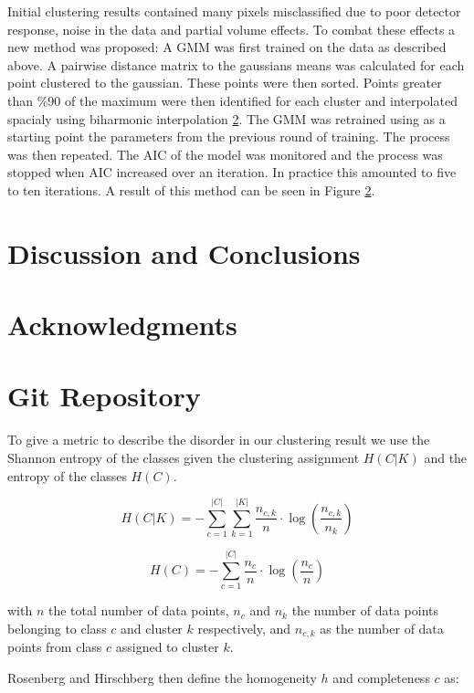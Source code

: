 \documentclass[a4paper,11pt]{article}
\begin{document}
Initial clustering results contained many pixels misclassified due to poor detector response, noise in the data and partial volume effects. To combat these effects a new method was proposed: A GMM was first trained on the data as described above. A pairwise distance matrix to the gaussians means was calculated for each point clustered to the gaussian. These points were then sorted. Points greater than \%90 of the maximum were then identified for each cluster and interpolated spacialy using biharmonic interpolation \ref{}. The GMM was retrained using as a starting point the parameters from the previous round of training. The process was then repeated. The AIC of the model was monitored and the process was stopped when AIC increased over an iteration. In practice this amounted to five to ten iterations. A result of this method can be seen in Figure \ref{}.

\section{Discussion and Conclusions}

\section*{Acknowledgments}

\appendix{}
\section{Git Repository}

To give a metric to describe the disorder in our clustering result we use the Shannon entropy of the classes given the clustering assignment $H(C|K)$ and the entropy of the classes  $H(C)$.

\begin{equation}
H(C|K) = - \sum_{c=1}^{|C|} \sum_{k=1}^{|K|} \frac{n_{c,k}}{n}
\cdot \log\left(\frac{n_{c,k}}{n_k}\right)
\end{equation}

\begin{equation}
H(C) = - \sum_{c=1}^{|C|} \frac{n_c}{n} \cdot \log\left(\frac{n_c}{n}\right)
\end{equation}

with $n$ the total number of data points, $n_c$ and $n_k$ the number of data points belonging to class $c$ and cluster $k$ respectively, and $n_{c,k}$ as the number of data points from class $c$ assigned to cluster $k$.

Rosenberg and Hirschberg then define the homogeneity $h$ and completeness $c$ as:
\end{document}
